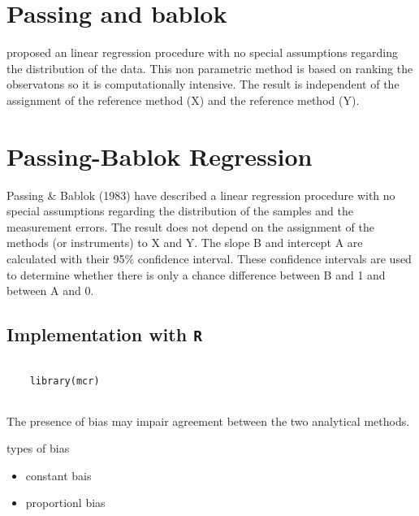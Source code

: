 \section{Passing and bablok}
proposed an linear regression procedure with no special assumptions regarding the distribution of the data.
This non parametric method is based on ranking the observatons so it is computationally intensive.
The result is independent of the assignment of the reference method (X) and the reference method (Y).

\section{Passing-Bablok Regression}


Passing \& Bablok (1983) have described a linear regression procedure with no special assumptions regarding the distribution of the samples and the measurement errors. The result does not depend on the assignment of the methods (or instruments) to X and Y. The slope B and intercept A are calculated with their 95\% confidence interval. These confidence intervals are used to determine whether there is only a chance difference between B and 1 and between A and 0.

\subsection{Implementation with \texttt{R}}

\begin{framed}
	\begin{verbatim}
	
	library(mcr)
	
	\end{verbatim}
\end{framed}
The presence of bias may impair agreement between the two analytical methods.

types of bias

\begin{itemize}
	\item constant bais
	\item proportionl bias
\end{itemize}


